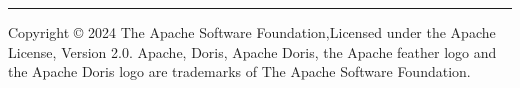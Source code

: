 \noindent \rule{\textwidth}{1pt}

Copyright © 2024 The Apache Software Foundation,Licensed under the Apache License, Version 2.0. Apache, Doris, Apache Doris, the Apache feather logo and the Apache Doris logo are trademarks of The Apache Software Foundation.
